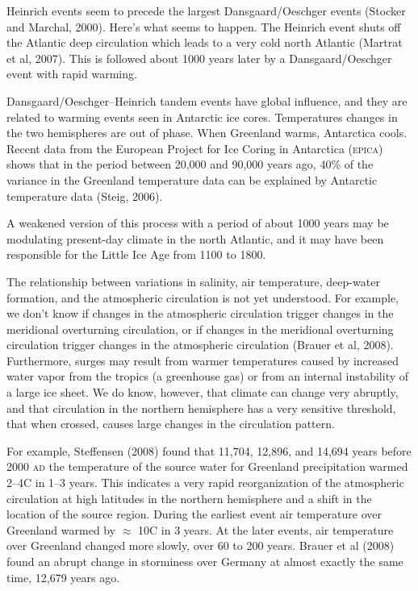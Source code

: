 \begin{enumerate}
\vitem Heinrich events seem to precede the largest Dansgaard/Oeschger
events (Stocker and Marchal, 2000). Here's what seems to happen. The
Heinrich event shuts off the Atlantic deep circulation which leads to
a very cold north Atlantic (Martrat et al, 2007). This is followed
about 1000 years later by a Dansgaard/Oeschger event with rapid
warming.

\vitem Dansgaard/Oeschger--Heinrich tandem events have global
influence, and they are related to warming events seen in Antarctic
ice cores. Temperatures changes in the two hemispheres are out of
phase. When Greenland warms, Antarctica cools. Recent data from the
European Project for Ice Coring in Antarctica (\textsc{epica}) shows
that in the period between 20,000 and 90,000 years ago, 40\% of the
variance in the Greenland temperature data can be explained by
Antarctic temperature data (Steig, 2006).

\vitem A weakened version of this process with a period of about 1000
years may be modulating present-day climate in the north Atlantic, and
it may have been responsible for the Little Ice Age from 1100 to 1800.
\end{enumerate}

The relationship between variations in salinity, air temperature,
deep-water formation, and the atmospheric circulation is not yet
understood. For example, we don't know if changes in the atmospheric
circulation trigger changes in the meridional overturning circulation,
or if changes in the meridional overturning circulation trigger
changes in the atmospheric circulation (Brauer et al,
2008). Furthermore, surges may result from warmer temperatures caused
by increased water vapor from the tropics (a greenhouse gas) or from
an internal instability of a large ice sheet. We do know, however,
that climate can change very abruptly, and that circulation in the
northern hemisphere has a very sensitive threshold, that when crossed,
causes large changes in the circulation pattern.

For example, Steffensen (2008) found that 11,704, 12,896, and 14,694
years before 2000 \textsc{ad} the temperature of the source water for
Greenland precipitation warmed 2--4\degrees C in 1--3 years. This
indicates a very rapid reorganization of the atmospheric circulation
at high latitudes in the northern hemisphere and a shift in the
location of the source region. During the earliest event air
temperature over Greenland warmed by $\approx$ 10\degrees C in 3
years. At the later events, air temperature over Greenland changed
more slowly, over 60 to 200 years. Brauer et al (2008) found an abrupt
change in storminess over Germany at almost exactly the same time,
12,679 years ago.

